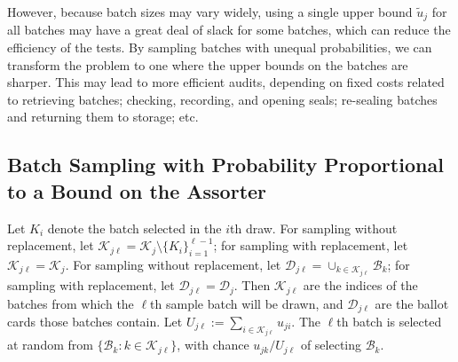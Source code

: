 \documentclass[12pt,runningheads]{llncs}
\newcommand{\cB}{\ensuremath{\mathcal{B}}}
\newcommand{\cD}{\ensuremath{\mathcal{D}}}
\newcommand{\mc}[1]{\ensuremath{\mathcal{#1}}}
\begin{document}
{However, because batch sizes may vary widely, using a single upper bound $\widetilde{u}_j$ for all batches may have a great 
deal of slack for some batches, which can reduce the efficiency of the tests.
By sampling batches with unequal probabilities, we can transform the problem to one where the upper bounds on the
batches are sharper. 
This may lead to more efficient audits, depending on fixed costs related to retrieving batches; checking, recording, and opening seals; 
re-sealing batches and returning them to storage; etc.

\subsection{Batch Sampling with Probability Proportional to a Bound on the Assorter}

Let $K_i$ denote the batch selected in the $i$th draw.
For sampling without replacement, let $\mc{K}_{j\ell} = \mc{K}_j \setminus \{K_i\}_{i=1}^{\ell-1}$; for sampling
with replacement, let $\mc{K}_{j\ell} = \mc{K}_j$.
For sampling without replacement, let $\cD_{j\ell} = \cup_{k \in \mc{K}_{j\ell}} \cB_k$;
for sampling with replacement, let $\cD_{j\ell} = \cD_j$.
Then $\mc{K}_{j\ell}$ are the indices of the batches from which the
$\ell$th sample batch will be drawn, and $\cD_{j\ell}$ are the ballot cards those batches contain.
Let $U_{j\ell} := \sum_{i \in \mc{K}_{j\ell}} u_{ji}$.
The $\ell$th batch is selected at random from $\{\cB_k : k \in \mc{K}_{j\ell} \}$, with chance $u_{jk}/U_{j\ell}$ 
of selecting $\cB_k$.

}
\end{document}
